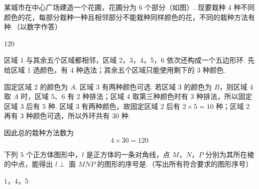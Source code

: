 \begin{problem}
某城市在中心广场建造一个花圃，花圃分为 \(6\text{ 个}\)部分（如图）. 现要栽种 \(4\text{ 种}\)不同颜色的花，每部分栽种一种且相邻部分不能栽种同样颜色的花，不同的栽种方法有\fillinblank{} 种.（以数字作答）

\end{problem}

\begin{answer}
\(120\)
\end{answer}

\begin{solution}
区域 1 与其余五个区域都相邻，区域 2，3，4，5，6 依次还构成一个五边形环. 先给区域 1 选颜色，有 \(4\) 种选法；其余五个区域只能使用剩下的 \(3\) 种颜色.

固定区域 2 的颜色为 \(A\). 区域 3 有两种颜色可选. 若区域 3 的颜色为 \(B\)，则区域 4 取 \(A\) 时，区域 5、6 有 \(2\) 种排法；区域 4 取第三种颜色时有 \(3\) 种排法，所以固定区域 3 后有 \(5\) 种. 区域 3 有两种颜色，故固定区域 2 后有 \(2\times5=10\) 种；区域 2 再有 \(3\) 种颜色可选，所以外环共有 \(30\) 种.

因此总的栽种方法数为
\[
4\times30=120
\]
\end{solution}

\begin{problem}
下列 \(5\text{ 个}\)正方体图形中，\(l\) 是正方体的一条对角线，点 \(M\)，\(N\)，\(P\) 分别为其所在棱的中点，能得出 \(l \perp\) 面 \(MNP\) 的图形的序号是\fillinblank{}.（写出所有符合要求的图形序号）

\end{problem}

\begin{answer}
\(1\)，\(4\)，\(5\)
\end{answer}

